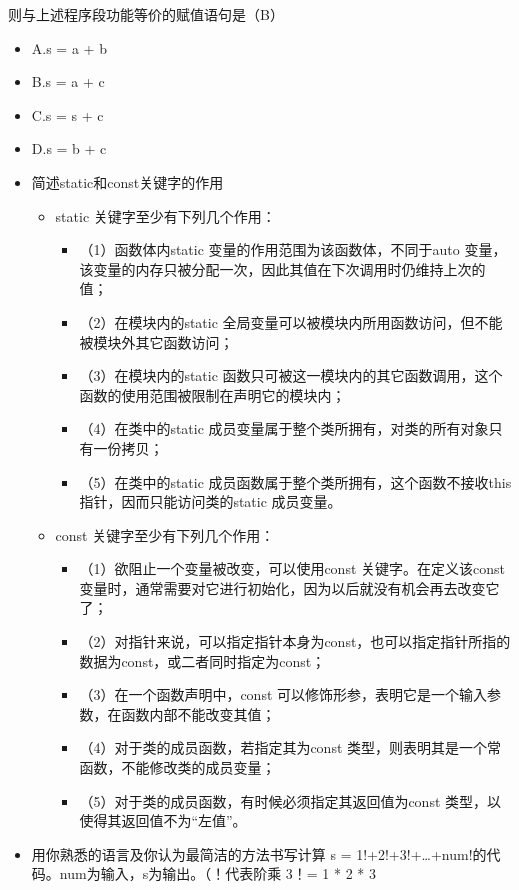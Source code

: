 \documentclass[9pt, b5paper]{article}
\begin{document}
则与上述程序段功能等价的赋值语句是（B）
\begin{itemize}
\item A.s = a + b
\item B.s = a + c
\item C.s = s + c
\item D.s = b + c
\end{itemize}
\begin{itemize}
\item 简述static和const关键字的作用
\begin{itemize}
\item static 关键字至少有下列几个作用：
\begin{itemize}
\item （1）函数体内static 变量的作用范围为该函数体，不同于auto 变量，该变量的内存只被分配一次，因此其值在下次调用时仍维持上次的值；
\item （2）在模块内的static 全局变量可以被模块内所用函数访问，但不能被模块外其它函数访问；
\item （3）在模块内的static 函数只可被这一模块内的其它函数调用，这个函数的使用范围被限制在声明它的模块内；
\item （4）在类中的static 成员变量属于整个类所拥有，对类的所有对象只有一份拷贝；
\item （5）在类中的static 成员函数属于整个类所拥有，这个函数不接收this 指针，因而只能访问类的static 成员变量。
\end{itemize}
\item const 关键字至少有下列几个作用：
\begin{itemize}
\item （1）欲阻止一个变量被改变，可以使用const 关键字。在定义该const 变量时，通常需要对它进行初始化，因为以后就没有机会再去改变它了；
\item （2）对指针来说，可以指定指针本身为const，也可以指定指针所指的数据为const，或二者同时指定为const；
\item （3）在一个函数声明中，const 可以修饰形参，表明它是一个输入参数，在函数内部不能改变其值；
\item （4）对于类的成员函数，若指定其为const 类型，则表明其是一个常函数，不能修改类的成员变量；
\item （5）对于类的成员函数，有时候必须指定其返回值为const 类型，以使得其返回值不为“左值”。
\end{itemize}
\end{itemize}
\item 用你熟悉的语言及你认为最简洁的方法书写计算 s = 1!+2!+3!+…+num!的代码。num为输入，s为输出。（！代表阶乘 3！= 1 * 2 * 3

\end{itemize}
\end{document}
